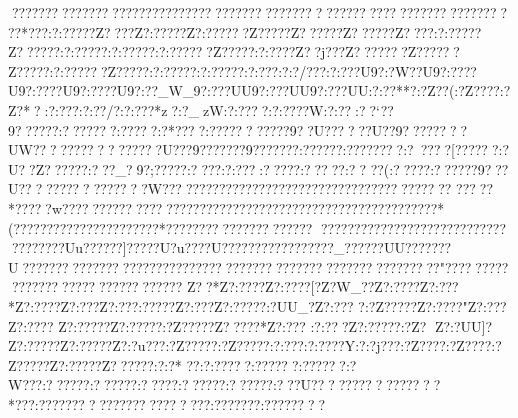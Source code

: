 {{{{{{{{{{{{{{{{{{{{{{{{{{{{{{{{{{{{{{{{{{{{{{{{{{{{{{{{{{{{{{{{{{{{{{{{{{{{{{{{{{{{{{{{{{{{{{{{{{{{{{{{{{{{{{{{{{{{{{{{{{{{{{{{{{{{{{{{{{{{{{{{{{{{{{{{{{{{{{{{{{{{{{{{{{{{{{{{{{{{{{{{{{{{{{{{{{{{{{{{{{{{{{{{{{{{{{{{{{{{{{{{{{{{{{{{{{{{{{{{{{{{{{{{{{{{{{{{{{{{{{{{{{{{{{{{{{{{{{{{{{{{{{{{{{{{{{{{{{{{{{{{{{{{{{{{{{{{{{{{{{{{{{{{{{{{{{{{{{{{{{{{{{{{{{{{{{{{{{{{{{{{{{{{{{{{{{{{{{{{{{{{{{{{{{{{{{{{{{{{{{{{{{{{{{{{{{{{{{{{{{{{{{{{{{{{{{{{{{{{{{{{{{{{{{{{{{{{{{{{{{{{{{{{{{{{{{{{{{{{{{{{{{{{{{{{{{{{{{{{{{{{{{{{{{{{{{{{{{{{{{{{{{{{{{{{{{{{{{{{{{{{{{{{{{{{{{{{{{{{{{{{{{{{{{{{{{{{{{{{{{{{{{{{{{{{{{{{{{{{{{{{{{{{{{{{{{{{{{{{{{{{{{{{{{{{{{{{{{{{{{{{{{{{{{{{{{{{{{{{{{{{{{{{{{{{{{{{{{{{{{{{{{{{{{{{{{{{{{{{{{{{{{{{{{{{{{{{{{{{{{{{{{{{{{{{{{{{{{{{{{{{{{{{{{{{{{{{{{{{{{{{{{{{{{{{{{{{{{{{{{{{{{{{{{{{{{{{{{{{{{{{{{{{{{{{{{???????????????????????????????????????????????????????????????????????*???:?:?????Z????Z?:?????Z?:??????Z?????Z??????Z??????Z????:?:?????Z??????:?:?????:?:?????:?:??????Z?????:?:? ???Z??j???Z???????Z??????Z?????:?:??????Z?????:?:?????:?:?????:?:???:?:?/???:?:???}U9?:?W??U9?:????U9?:????U9?:????U9?:??_W_9?:???UU9?:???UU9?:???UU:?:??**?:?Z??(  :?Z???? :?Z?*?:?:???:?:??/?:?:???*z?:?_zW:?:????:?:????W:?:??^^U:??`??9??????:???????:?????:?*????:???????????9??U??????U??9????????UW????????????????U???9???????9???????:??????:????????:?~????[??????:?U??Z??????:???_?9?;?????:????  :?:???:????? :?????:??
??(:?? ???:??????9???U????????????????W??????????????????????????????????????????
?????*?????w????????????????????????????????????????????????? ??????*(??????????????????????*?????????????????????
????????????????????????????????????Uu??????]?????U?}u????U?????????????????_??????UU???????U???????????????????????????????????????????????????????????"?? ???????????????????????? ???????
Z??*   Z?:???? Z?:???? [?Z?W_??Z?:???? Z?:??? *Z?:???? Z?:???  Z?:?? {?:?????Z?:???  Z?:???? {?:?UU_?Z?:???
?:?Z?????Z?:????"Z?:???Z?:????
Z?:?????Z?:?????:?Z?????Z?????*Z?:???
 :?:?? ?Z?:?????:?Z?
  Z?:?UU]?Z?:?????Z?:?????Z?:?u???:?Z?????:?Z?????:?:???:?:????Y:?:?j???:?Z? ???:?Z? ???:?Z?????Z?:?????Z??????:?:?* ??:?:? ????:??????:??????:?W???:??????:??????:?????:??????:??????:???U????????????????*???:???????????????????????:???????:????????
}}}}}}}}}}}}}}}}}}}}}}}}}}}}}}}}}}}}}}}}}}}}}}}}}}}}}}}}}}}}}}}}}}}}}}}}}}}}}}}}}}}}}}}}}}}}}}}}}}}}}}}}}}}}}}}}}}}}}}}}}}}}}}}}}}}}}}}}}}}}}}}}}}}}}}}}}}}}}}}}}}}}}}}}}}}}}}}}}}}}}}}}}}}}}}}}}}}}}}}}}}}}}}}}}}}}}}}}}}}}}}}}}}}}}}}}}}}}}}}}}}}}}}}}}}}}}}}}}}}}}}}}}}}}}}}}}}}}}}}}}}}}}}}}}}}}}}}}}}}}}}}}}}}}}}}}}}}}}}}}}}}}}}}}}}}}}}}}}}}}}}}}}}}}}}}}}}}}}}}}}}}}}}}}}}}}}}}}}}}}}}}}}}}}}}}}}}}}}}}}}}}}}}}}}}}}}}}}}}}}}}}}}}}}}}}}}}}}}}}}}}}}}}}}}}}}}}}}}}}}}}}}}}}}}}}}}}}}}}}}}}}}}}}}}}}}}}}}}}}}}}}}}}}}}}}}}}}}}}}}}}}}}}}}}}}}}}}}}}}}}}}}}}}}}}}}}}}}}}}}}}}}}}}}}}}}}}}}}}}}}}}}}}}}}}}}}}}}}}}}}}}}}}}}}}}}}}}}}}}}}}}}}}}}}}}}}}}}}}}}}}}}}}}}}}}}}}}}}}}}}}}}}}}}}}}}}}}}}}}}}}}}}}}}}}}}}}}}}}}}}}}}}}}}}}}}}}}}}}}}}}}}}}}}}}}}}}}}}}}}}}}}}}}}}}}}}}}}}}}}}}}}}}}}}}}}}}}}}}}}}}}}}}}}}}}}}}}}}}}}}}}}}}}}}}}}}}
